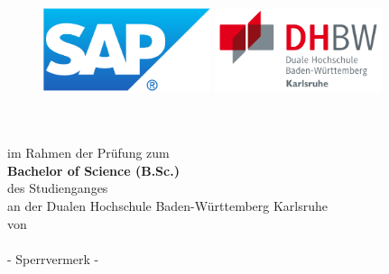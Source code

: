 \thispagestyle{empty}
\begin{titlepage}
\enlargethispage{4cm}

\begin{figure}           %
	\begin{minipage}{0.49\textwidth}
		\flushleft
		\includegraphics[height=2.5cm]{Bilder/Logos/Logo_SAP.pdf} 
	\end{minipage}
	\hfill
	\begin{minipage}{0.49\textwidth}
		\flushright
		\includegraphics[height=2.5cm]{Bilder/Logos/Logo_DHBW.pdf} 
	\end{minipage}
\end{figure} 
\vspace*{0.1cm}

\begin{center}
	\huge{\textbf{\titel}}\\[1.5cm]
	\Large{\textbf{\arbeit}}\\[0.5cm]
	\normalsize{im Rahmen der Prüfung zum\\[1ex] \textbf{Bachelor of Science (B.Sc.)}}\\[0.5cm]
	\Large{des Studienganges \studiengang}\\[1ex]
	\normalsize{an der Dualen Hochschule Baden-Württemberg Karlsruhe}\\[1cm]
	\normalsize{von}\\[1ex] \Large{\textbf{\autor}} \\[1cm]


	\large{{\color{red}- Sperrvermerk -}}\\[1cm]



\end{center}
\end{titlepage}
